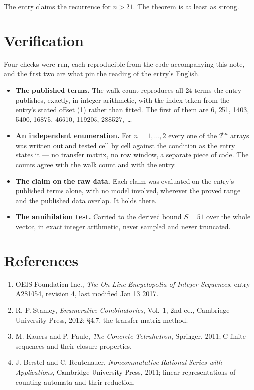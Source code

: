 \documentclass[11pt]{article}
\theoremstyle{definition}
\begin{document}
The entry claims the recurrence for $n > 21$. The theorem is at least as strong.

\section{Verification}

Four checks were run, each reproducible from the code accompanying this note, and the first two are what pin the reading of the entry's English.

\begin{itemize}

\item {\bfseries The published terms.} The walk count reproduces all 24 terms the entry publishes, exactly, in integer arithmetic, with the index taken from the entry's stated offset (1) rather than fitted. The first of them are 6, 251, 1403, 5400, 16875, 46610, 119205, 288527,~\dots

\item {\bfseries An independent enumeration.} For $n = 1,\dots,2$ every one of the $2^{6n}$ arrays was written out and tested cell by cell against the condition as the entry states it --- no transfer matrix, no row window, a separate piece of code. The counts agree with the walk count and with the entry.

\item {\bfseries The claim on the raw data.} Each claim was evaluated on the entry's published terms alone, with no model involved, wherever the proved range and the published data overlap. It holds there.

\item {\bfseries The annihilation test.} Carried to the derived bound $S = 51$ over the whole vector, in exact integer arithmetic, never sampled and never truncated.

\end{itemize}

\section{References}

\begin{enumerate}

\item OEIS Foundation Inc., \emph{The On-Line Encyclopedia of Integer Sequences}, entry \href{https://oeis.org/A281054}{A281054}, revision 4, last modified Jan 13 2017.

\item R. P. Stanley, \emph{Enumerative Combinatorics}, Vol.~1, 2nd ed., Cambridge University Press, 2012; \S4.7, the transfer-matrix method.

\item M. Kauers and P. Paule, \emph{The Concrete Tetrahedron}, Springer, 2011; C-finite sequences and their closure properties.

\item J. Berstel and C. Reutenauer, \emph{Noncommutative Rational Series with Applications}, Cambridge University Press, 2011; linear representations of counting automata and their reduction.

\end{enumerate}
\end{document}
